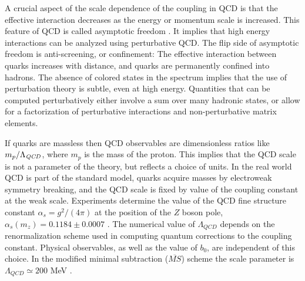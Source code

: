  A crucial aspect of the scale dependence of the coupling in QCD is that
the effective interaction decreases as the energy or momentum scale is 
increased. This feature of QCD is called asymptotic freedom
\cite{Gross:1973id,Politzer:1973fx}. It implies that high energy 
interactions can be analyzed using perturbative QCD. The flip side of 
asymptotic freedom is anti-screening, or confinement: The effective 
interaction between quarks increases with distance, and quarks are 
permanently confined into hadrons. The absence of colored states in 
the spectrum implies that the use of perturbation theory is subtle, 
even at high energy. Quantities that can be computed perturbatively 
either involve a sum over many hadronic states, or allow for a 
factorization of perturbative interactions and non-perturbative 
matrix elements. 

 If quarks are massless then QCD observables are dimensionless ratios
like $m_p/\Lambda_{\it QCD}$, where $m_p$ is the mass of the proton. This
implies that the QCD scale is not a parameter of the theory, but reflects
a choice of units. In the real world QCD is part of the standard model,
quarks acquire masses by electroweak symmetry breaking, and the QCD 
scale is fixed by value of the coupling constant at the weak scale. 
Experiments determine the value of the QCD fine structure constant
$\alpha_s=g^2/(4\pi)$ at the position of the $Z$ boson pole, $\alpha_s
(m_z)= 0.1184\pm 0.0007$ \cite{Nakamura:2010zzi}. The numerical value 
of $\Lambda_{QCD}$ depends on the renormalization scheme used in
computing quantum corrections to the coupling constant. Physical 
observables, as well as the value of $b_0$, are independent of this 
choice. In the modified minimal subtraction ($\overline{MS}$) scheme
the scale parameter is $\Lambda_{QCD}\simeq 200$ MeV \cite{Nakamura:2010zzi}.

